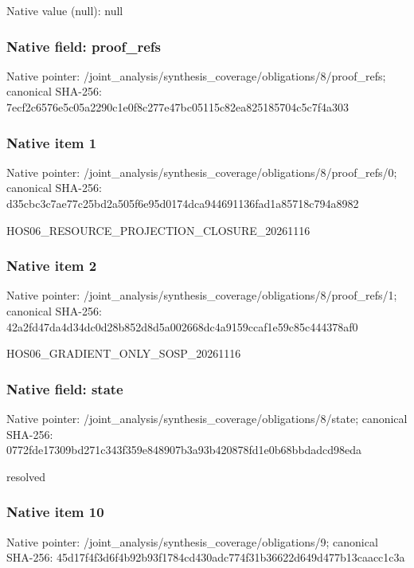 \documentclass[10pt,a4paper]{article}
\begin{document}
Native value (null): null

\subsubsection{Native field: proof\_\allowbreak{}refs}
Native pointer: /joint\_\allowbreak{}analysis/synthesis\_\allowbreak{}coverage/obligations/8/proof\_\allowbreak{}refs; canonical SHA-256: 7ecf2c6576e5c05a2290c1e0f8c277e47bc05115c82ea825185704c5c7f4a303

\subsubsection{Native item 1}
Native pointer: /joint\_\allowbreak{}analysis/synthesis\_\allowbreak{}coverage/obligations/8/proof\_\allowbreak{}refs/0; canonical SHA-256: d35cbc3c7ae77c25bd2a505f6e95d0174dca944691136fad1a85718c794a8982

\begingroup\raggedright\sloppy HOS06\_\allowbreak{}RESOURCE\_\allowbreak{}PROJECTION\_\allowbreak{}CLOSURE\_\allowbreak{}20261116\par\endgroup

\subsubsection{Native item 2}
Native pointer: /joint\_\allowbreak{}analysis/synthesis\_\allowbreak{}coverage/obligations/8/proof\_\allowbreak{}refs/1; canonical SHA-256: 42a2fd47da4d34dc0d28b852d8d5a002668dc4a9159ccaf1e59c85c444378af0

\begingroup\raggedright\sloppy HOS06\_\allowbreak{}GRADIENT\_\allowbreak{}ONLY\_\allowbreak{}SOSP\_\allowbreak{}20261116\par\endgroup

\subsubsection{Native field: state}
Native pointer: /joint\_\allowbreak{}analysis/synthesis\_\allowbreak{}coverage/obligations/8/state; canonical SHA-256: 0772fde17309bd271c343f359e848907b3a93b420878fd1e0b68bbdadcd98eda

\begingroup\raggedright\sloppy resolved\par\endgroup

\subsubsection{Native item 10}
Native pointer: /joint\_\allowbreak{}analysis/synthesis\_\allowbreak{}coverage/obligations/9; canonical SHA-256: 45d17f4f3d6f4b92b93f1784cd430adc774f31b36622d649d477b13caacc1c3a
\end{document}
